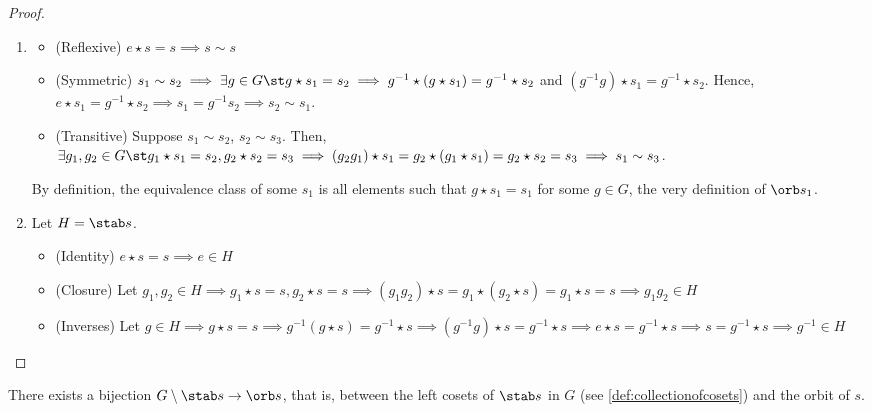 \documentclass[12pt,oneside]{article}
\begin{document}
\begin{proof}
  \begin{enumerate}
    \item \begin{itemize}
      \item (Reflexive) $e \star s = s \implies s \sim s$
      \item (Symmetric) $s_1 \sim s_2 \implies \exists g \in G \st g \star s_1 = s_2 \implies g^{-1} \star (g \star s_1) = g^{-1} \star s_2$ and $(g^{-1} g) \star s_1 = g^{-1} \star s_2$. Hence, $e\star s_1 = g^{-1} \star s_2 \implies s_1 = g^{-1} s_2 \implies s_2 \sim s_1$.
      \item (Transitive) Suppose $s_1 \sim s_2$, $s_2 \sim s_3$. Then, $\exists g_1, g_2 \in G \st g_1 \star s_1 = s_2, g_2 \star s_2 = s_3 \implies (g_2 g_1) \star s_1= g_2 \star (g_1 \star s_1) = g_2 \star s_2 = s_3 \implies s_1 \sim s_3$.
    \end{itemize}
    By definition, the equivalence class of some $s_1$ is all elements such that $g \star s_1 = s_1$ for some $g \in G$, the very definition of $\orb s_1$.
    \item Let $H = \stab s$.
    \begin{itemize}
      \item (Identity) $e \star s = s \implies e \in H$
      \item (Closure) Let $g_1, g_2 \in H \implies g_1 \star s = s, g_2 \star s = s \implies (g_1 g_2) \star s = g_1 \star (g_2 \star s) = g_1 \star s = s \implies g_1 g_2 \in H$
      \item (Inverses) Let $g \in H \implies g \star s = s \implies g^{-1} (g \star s) = g^{-1} \star s \implies (g^{-1} g) \star s = g^{-1} \star s \implies e\star s = g^{-1} \star s \implies s = g^{-1} \star s \implies g^{-1} \in H$
    \end{itemize}
  \end{enumerate}
\end{proof}

\begin{proposition}\label{prop:orbitstab}
  There exists a bijection $G\setminus \stab s \to \orb s$, that is, between the left cosets of $\stab s$ in $G$ (see \cref{def:collectionofcosets}) and the orbit of $s$.
\end{proposition}
\end{document}
